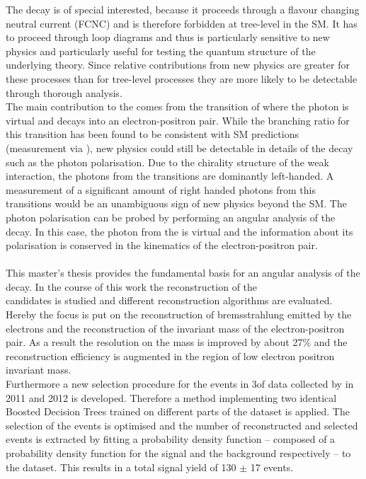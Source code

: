 The \BdKstee decay is of special interested, because it proceeds through a flavour changing neutral current (FCNC) and is therefore forbidden at tree-level in the SM. It has to proceed through loop diagrams and thus is particularly sensitive to new physics and particularly useful for testing the quantum structure of the underlying theory. Since relative contributions from new physics are greater for these processes than for tree-level processes they are more likely to be detectable through thorough analysis.\\
The main contribution to the \BdKstee comes from the transition of \bsg where the photon is virtual and decays into an electron-positron pair. While the branching ratio for this transition has been found to be consistent with SM predictions (measurement via \BdKstg \cite{pdg}), new physics could still be detectable in details of the decay such as the photon polarisation. Due to the chirality structure of the weak interaction, the photons from the \bsg transitions are dominantly left-handed. A measurement of a significant amount of right handed photons from this transitions would be an unambiguous sign of new physics beyond the SM.
The photon polarisation can be probed by performing an angular analysis of the \BdKstee decay. In this case, the photon from the \bsg is virtual and the information about its polarisation is conserved in the kinematics of the electron-positron pair.\\
\\
This master's thesis provides the fundamental basis for an angular analysis of the \BdKstee decay. In the course of this work the reconstruction of the\\ \BdKstee candidates is studied and different reconstruction algorithms are evaluated. Hereby the focus is put on the reconstruction of bremsstrahlung emitted by the electrons and the reconstruction of the invariant mass of the electron-positron pair. As a result the resolution on the \Bd mass is improved by about 27\% and the reconstruction efficiency is augmented in the region of low electron positron invariant mass.\\
Furthermore a new selection procedure for the \BdKstee events in 3\invfb of data collected by \lhcb in 2011 and 2012 is developed. Therefore a method implementing two identical Boosted Decision Trees trained on different parts of the dataset is applied. The selection of the \BdKstee events is optimised and the number of reconstructed and selected \BdKstee events is extracted by fitting a probability density function -- composed of a probability density function for the signal and the background respectively -- to the dataset. This results in a total signal yield of 130 $\pm$ 17 \BdKstee events.\\